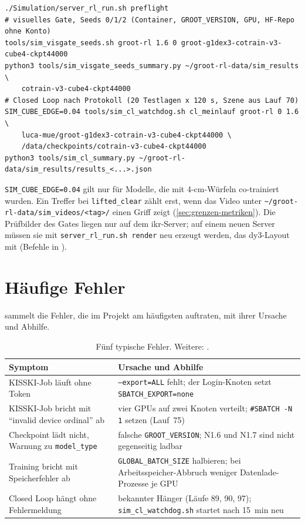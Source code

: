 \begin{verbatim}
./Simulation/server_rl_run.sh preflight
# visuelles Gate, Seeds 0/1/2 (Container, GROOT_VERSION, GPU, HF-Repo ohne Konto)
tools/sim_visgate_seeds.sh groot-rl 1.6 0 groot-g1dex3-cotrain-v3-cube4-ckpt44000
python3 tools/sim_visgate_seeds_summary.py ~/groot-rl-data/sim_results \
    cotrain-v3-cube4-ckpt44000
# Closed Loop nach Protokoll (20 Testlagen x 120 s, Szene aus Lauf 70)
SIM_CUBE_EDGE=0.04 tools/sim_cl_watchdog.sh cl_meinlauf groot-rl 0 1.6 \
    luca-mue/groot-g1dex3-cotrain-v3-cube4-ckpt44000 \
    /data/checkpoints/cotrain-v3-cube4-ckpt44000
python3 tools/sim_cl_summary.py ~/groot-rl-data/sim_results/results_<...>.json
\end{verbatim}

\texttt{SIM\_CUBE\_EDGE=0.04} gilt nur für Modelle, die mit 4-cm-Würfeln co-trainiert wurden.
Ein Treffer bei \texttt{lifted\_clear} zählt erst, wenn das Video unter
\texttt{\textasciitilde/groot-rl-data/sim\_videos/<tag>/} einen Griff zeigt
(\cref{sec:grenzen-metriken}). Die Prüfbilder des Gates liegen nur auf dem \acs{ikr}-Server; auf
einem neuen Server müssen sie mit \texttt{server\_rl\_run.sh render} neu erzeugt werden,
das dy3-Layout mit \doc{tools/layout_shift.py --dy 0.03} (Befehle in ).

\Needspace{14\baselineskip}
\section{Häufige Fehler}
\label{sec:anl-fehler}

 sammelt die Fehler, die im Projekt am häufigsten auftraten, mit ihrer
Ursache und Abhilfe.

\begin{table}[H]
  \centering
  \begin{tabularx}{\linewidth}{XX}
    \toprule
    Symptom & Ursache und Abhilfe \\
    \midrule
    KISSKI-Job läuft ohne Token & \texttt{--export=ALL} fehlt; der Login-Knoten setzt
      \texttt{SBATCH\_EXPORT=none} \\
    KISSKI-Job bricht mit \enquote{invalid device ordinal} ab & vier GPUs auf zwei Knoten
      verteilt; \texttt{\#SBATCH -N 1} setzen (Lauf~75) \\
    Checkpoint lädt nicht, Warnung zu \texttt{model\_type} & falsche \texttt{GROOT\_VERSION};
      N1.6 und N1.7 sind nicht gegenseitig ladbar \\
    Training bricht mit Speicherfehler ab & \texttt{GLOBAL\_BATCH\_SIZE} halbieren; bei
      Arbeitsspeicher-Abbruch weniger Datenlade-Prozesse je GPU \\
    Closed Loop hängt ohne Fehlermeldung & bekannter Hänger (Läufe 89, 90, 97);
      \texttt{sim\_cl\_watchdog.sh} startet nach 15~min neu \\
    \bottomrule
  \end{tabularx}
  \caption{Fünf typische Fehler. Weitere: .}
  \label{tab:anl-fehler}
\end{table}
